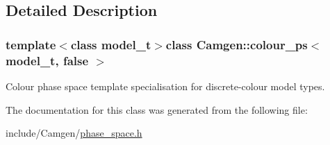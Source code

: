 \subsection{Detailed Description}
\subsubsection*{template$<$class model\+\_\+t$>$class Camgen\+::colour\+\_\+ps$<$ model\+\_\+t, false $>$}

Colour phase space template specialisation for discrete-\/colour model types. 



The documentation for this class was generated from the following file\+:\begin{DoxyCompactItemize}
\item 
include/\+Camgen/\hyperlink{a00718}{phase\+\_\+space.\+h}\end{DoxyCompactItemize}
